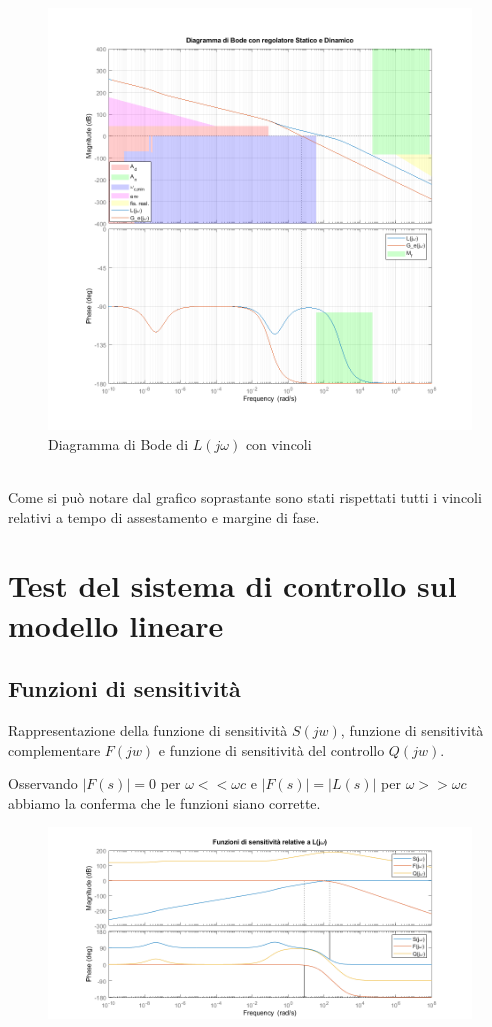 \documentclass{article}
\begin{document}
\begin{figure}[!h]
\centering
\includegraphics[width=1\textwidth]{grafici/fig3.png}
\caption{\label{fig:orbit}Diagramma di Bode di $L(j\omega)$ con vincoli}
\end{figure}\\
Come si può notare dal grafico soprastante sono stati rispettati tutti i vincoli relativi a tempo di assestamento e margine di fase.
\pagebreak

\section{Test del sistema di controllo sul modello lineare}
\subsection{Funzioni di sensitività}
Rappresentazione della funzione di sensitività $S(jw)$, funzione di sensitività complementare $F(jw)$ e funzione di sensitività del controllo $Q(jw)$.

Osservando $|F(s)| = 0$ per $\omega << \omega c $ e  $|F(s)| = |L(s)| $ per $\omega >> \omega c$ abbiamo la conferma che le funzioni siano corrette.
\begin{figure}[!h]
\centering
\includegraphics[width=1\textwidth]{grafici/fig10.png}
\end{figure}
\end{document}
